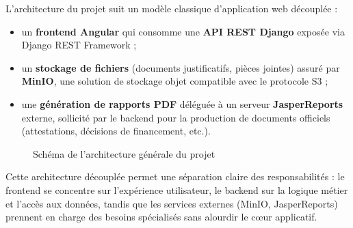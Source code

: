 L'architecture du projet suit un modèle classique d'application web
découplée :

\begin{itemize}
  \item un \textbf{frontend Angular} qui consomme une \textbf{API REST
        Django} exposée via Django REST Framework ;
  \item un \textbf{stockage de fichiers} (documents justificatifs,
        pièces jointes) assuré par \textbf{MinIO}, une solution de
        stockage objet compatible avec le protocole S3 ;
  \item une \textbf{génération de rapports PDF} déléguée à un serveur
        \textbf{JasperReports} externe, sollicité par le backend pour la
        production de documents officiels (attestations, décisions de
        financement, etc.).
\end{itemize}

\begin{figure}[H]
  \centering
  \caption{Schéma de l'architecture générale du projet}
  \label{fig:architecture}
\end{figure}

Cette architecture découplée permet une séparation claire des
responsabilités : le frontend se concentre sur l'expérience utilisateur,
le backend sur la logique métier et l'accès aux données, tandis que les
services externes (MinIO, JasperReports) prennent en charge des besoins
spécialisés sans alourdir le cœur applicatif.
